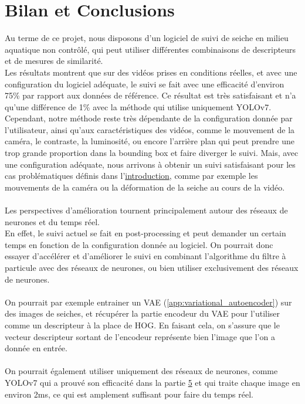 \pagestyle{plain}
\chapter{Bilan et Conclusions}
Au terme de ce projet, nous disposons d'un logiciel de suivi de seiche en milieu aquatique non contrôlé, qui peut utiliser différentes combinaisons de descripteurs et de mesures de similarité.\\
Les résultats montrent que sur des vidéos prises en conditions réelles, et avec une configuration du logiciel adéquate, le suivi se fait avec une efficacité d'environ 75\% par rapport aux données de référence. Ce résultat est très satisfaisant et n'a qu'une différence de 1\% avec la méthode qui utilise uniquement YOLOv7.\\
Cependant, notre méthode reste très dépendante de la configuration donnée par l'utilisateur, ainsi qu'aux caractéristiques des vidéos, comme le mouvement de la caméra, le contraste, la luminosité, ou encore l'arrière plan qui peut prendre une trop grande proportion dans la bounding box et faire diverger le suivi. Mais, avec une configuration adéquate, nous arrivons à obtenir un suivi satisfaisant pour les cas problématiques définis dans l'\hyperlink{chapter.1}{introduction}, comme par exemple les mouvements de la caméra ou la déformation de la seiche au cours de la vidéo.\\
\\
Les perspectives d'amélioration tournent principalement autour des réseaux de neurones et du temps réel.\\
En effet, le suivi actuel se fait en post-processing et peut demander un certain temps en fonction de la configuration donnée au logiciel. On pourrait donc essayer d'accélérer et d'améliorer le suivi en combinant l'algorithme du filtre à particule avec des réseaux de neurones, ou bien utiliser exclusivement des réseaux de neurones.\\
\\
On pourrait par exemple entrainer un VAE (\ref{app:variational_autoencoder}) sur des images de seiches, et récupérer la partie encodeur du VAE pour l'utiliser comme un descripteur à la place de HOG. En faisant cela, on s'assure que le vecteur descripteur sortant de l'encodeur représente bien l'image que l'on a donnée en entrée.\\
\\
On pourrait également utiliser uniquement des réseaux de neurones, comme YOLOv7 qui a prouvé son efficacité dans la partie \hyperlink{chapter.5}{5} et qui traite chaque image en environ 2ms, ce qui est amplement suffisant pour faire du temps réel.

\clearpage
